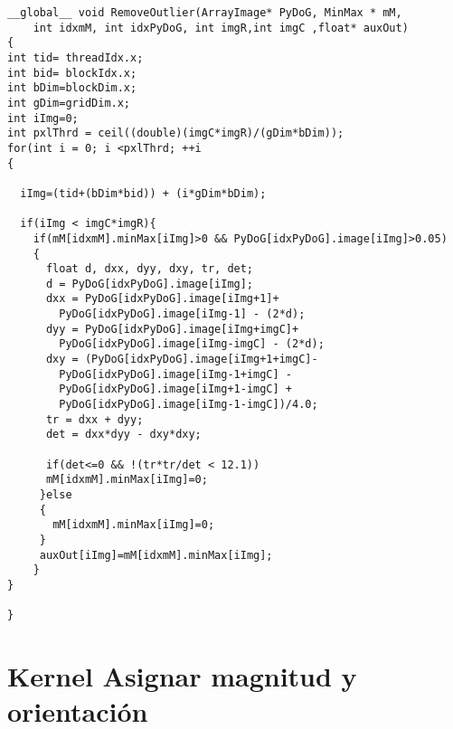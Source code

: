 \begin{small}
\begin{lstlisting}
__global__ void RemoveOutlier(ArrayImage* PyDoG, MinMax * mM,
	int idxmM, int idxPyDoG, int imgR,int imgC ,float* auxOut)
{
int tid= threadIdx.x;
int bid= blockIdx.x;
int bDim=blockDim.x;
int gDim=gridDim.x;
int iImg=0;
int pxlThrd = ceil((double)(imgC*imgR)/(gDim*bDim)); 
for(int i = 0; i <pxlThrd; ++i 
{

  iImg=(tid+(bDim*bid)) + (i*gDim*bDim); 
		
  if(iImg < imgC*imgR){
	if(mM[idxmM].minMax[iImg]>0 && PyDoG[idxPyDoG].image[iImg]>0.05)
	{
	  float d, dxx, dyy, dxy, tr, det;
	  d = PyDoG[idxPyDoG].image[iImg];
	  dxx = PyDoG[idxPyDoG].image[iImg+1]+
	  	PyDoG[idxPyDoG].image[iImg-1] - (2*d);
	  dyy = PyDoG[idxPyDoG].image[iImg+imgC]+
	  	PyDoG[idxPyDoG].image[iImg-imgC] - (2*d);
	  dxy = (PyDoG[idxPyDoG].image[iImg+1+imgC]-
	  	PyDoG[idxPyDoG].image[iImg-1+imgC] - 
	  	PyDoG[idxPyDoG].image[iImg+1-imgC] +
	  	PyDoG[idxPyDoG].image[iImg-1-imgC])/4.0;
	  tr = dxx + dyy;
	  det = dxx*dyy - dxy*dxy;
		
	  if(det<=0 && !(tr*tr/det < 12.1))
	  mM[idxmM].minMax[iImg]=0;
	 }else
	 {
	   mM[idxmM].minMax[iImg]=0;
	 }
     auxOut[iImg]=mM[idxmM].minMax[iImg];
	}
}
	
}
\end{lstlisting}

\end{small}
\pagebreak

\chapter{Kernel Asignar magnitud y orientación}


